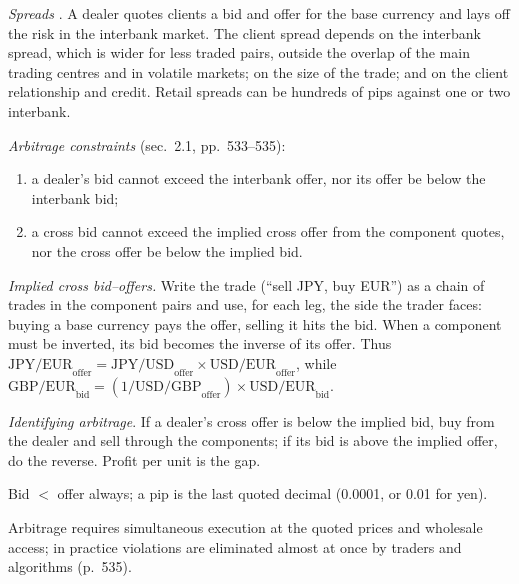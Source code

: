 \begin{qfmethod}\label{meth:fx-bid-offer-triangular-arbitrage}
 \emph{Spreads} \citep[chap.~10, sec.~2, pp.~531--533]{economics-investment-decision-makers-2013}. A dealer quotes clients a bid and offer for the base currency and lays off the risk in the interbank market. The client spread depends on the interbank spread, which is wider for less traded pairs, outside the overlap of the main trading centres and in volatile markets; on the size of the trade; and on the client relationship and credit. Retail spreads can be hundreds of pips against one or two interbank.

\emph{Arbitrage constraints} (sec.~2.1, pp.~533--535):
\begin{enumerate}
\item a dealer's bid cannot exceed the interbank offer, nor its offer be below the interbank bid;
\item a cross bid cannot exceed the implied cross offer from the component quotes, nor the cross offer be below the implied bid.
\end{enumerate}
\emph{Implied cross bid--offers.} Write the trade (``sell JPY, buy EUR'') as a chain of trades in the component pairs and use, for each leg, the side the trader faces: buying a base currency pays the offer, selling it hits the bid. When a component must be inverted, its bid becomes the inverse of its offer. Thus $\text{JPY/EUR}_{\text{offer}}=\text{JPY/USD}_{\text{offer}}\times\text{USD/EUR}_{\text{offer}}$, while $\text{GBP/EUR}_{\text{bid}}=(1/\text{USD/GBP}_{\text{offer}})\times\text{USD/EUR}_{\text{bid}}$.

\emph{Identifying arbitrage}. If a dealer's cross offer is below the implied bid, buy from the dealer and sell through the components; if its bid is above the implied offer, do the reverse. Profit per unit is the gap.

 Bid $<$ offer always; a pip is the last quoted decimal (0.0001, or 0.01 for yen).

 Arbitrage requires simultaneous execution at the quoted prices and wholesale access; in practice violations are eliminated almost at once by traders and algorithms (p.~535).


\end{qfmethod}
